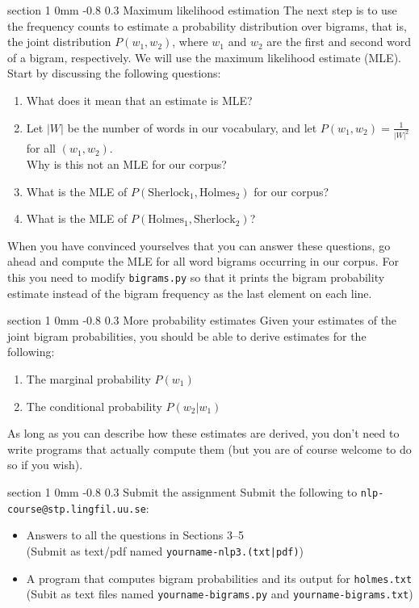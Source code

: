 \documentclass[11pt]{article}
\makeatletter
\newcommand{\newsec}[2]{\section{#1}\label{sec:#2}\noindent}
\renewcommand{\section}{\@startsection
{section}%
{1}%
{0mm}%
{-0.8\baselineskip}%
{0.3\baselineskip}%
{\bfseries\large}}%
\makeatother
\begin{document}
\newsec{Maximum likelihood estimation}{mle}%
The next step is to use the frequency counts to estimate a probability distribution over bigrams, that is,
the joint distribution $P(w_1, w_2)$, where $w_1$ and $w_2$ are the first and second word of a bigram, respectively.
We will use the maximum likelihood estimate (MLE). Start by discussing the following questions:
\begin{enumerate}[itemsep=0pt]
\item What does it mean that an estimate is MLE? %
\item Let $|W|$ be the number of words in our vocabulary, and let $P(w_1, w_2) = \frac{1}{|W|^2}$ for all $(w_1, w_2)$.\\
Why is this not an MLE for our corpus? %
\item What is the MLE of $P(\mbox{Sherlock}_1, \mbox{Holmes}_2)$ for our corpus? %
\item What is the MLE of $P(\mbox{Holmes}_1, \mbox{Sherlock}_2)$? %
\end{enumerate}
When you have convinced yourselves that you can answer these questions, go ahead and compute the MLE
for all word bigrams occurring in our corpus. For this you need to modify {\tt bigrams.py} so that it prints
the bigram probability estimate instead of the bigram frequency as the last element on each line.

\newsec{More probability estimates}{refine}%
Given your estimates of the joint bigram probabilities, you should be able to derive estimates for the following:
\begin{enumerate}[itemsep=0pt]
\item The marginal probability $P(w_1)$
\item The conditional probability $P(w_2 | w_1)$
\end{enumerate}
As long as you can describe how these estimates are derived, you don't need to write programs that
actually compute them (but you are of course welcome to do so if you wish).

\newsec{Submit the assignment}{submit}%
Submit the following to {\tt nlp-course@stp.lingfil.uu.se}: 
\begin{itemize}[noitemsep,topsep=0.2cm]
\item Answers to all the questions in Sections 3--5\\
(Submit as text/pdf named {\tt yourname-nlp3.(txt|pdf)})
\item A program that computes bigram probabilities and its output for {\tt holmes.txt}\\
(Subit as text files named {\tt yourname-bigrams.py} and {\tt yourname-bigrams.txt})
\end{itemize}
\end{document}
